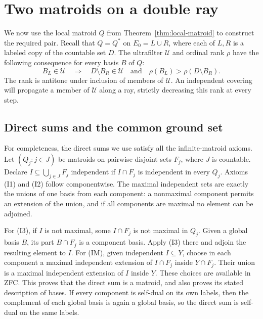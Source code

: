 \section{Two matroids on a double ray}\label{sec:counterexample}

We now use the local matroid $Q$ from
Theorem~\ref{thm:local-matroid} to construct the required pair.
Recall that $Q=Q^*$ on $E_0=L\mathbin{\dot\cup}R$, where each
of $L,R$ is a labeled copy of the countable set $D$. The ultrafilter
$\mathcal U$ and ordinal rank $\rho$ have the following consequence
for every basis $B$ of $Q$:
\begin{equation}\label{eq:outward-rank}
 B_L\in\mathcal U
 \quad\Longrightarrow\quad
 D\setminus B_R\in\mathcal U
 \quad\text{and}\quad
 \rho(B_L)>\rho(D\setminus B_R).
\end{equation}
The rank is antitone under inclusion of members of $\mathcal U$.
An independent covering will propagate a member of $\mathcal U$
along a ray, strictly decreasing this rank at every step.

\subsection{Direct sums and the common ground set}

For completeness, the direct sums we use satisfy all the infinite-matroid
axioms. Let $(Q_j:j\in J)$ be matroids on pairwise disjoint sets $F_j$,
where $J$ is countable. Declare $I\subseteq\bigcup_{j\in J}F_j$
independent if $I\cap F_j$ is independent in every $Q_j$.
Axioms (I1) and (I2) follow componentwise. The maximal independent
sets are exactly the unions of one basis from each component: a
nonmaximal component permits an extension of the union, and if all
components are maximal no element can be adjoined.

For (I3), if $I$ is not maximal, some $I\cap F_j$ is not maximal
in $Q_j$. Given a global basis $B$, its part $B\cap F_j$ is a
component basis. Apply (I3) there and adjoin the resulting element to
$I$. For (IM), given independent $I\subseteq Y$, choose in each
component a maximal independent extension of $I\cap F_j$ inside
$Y\cap F_j$. Their union is a maximal independent extension of $I$
inside $Y$. These choices are available in ZFC. This proves that the
direct sum is a matroid, and also proves its stated description of
bases. If every component is self-dual on its own labels, then the
complement of each global basis is again a global basis, so the direct
sum is self-dual on the same labels.

